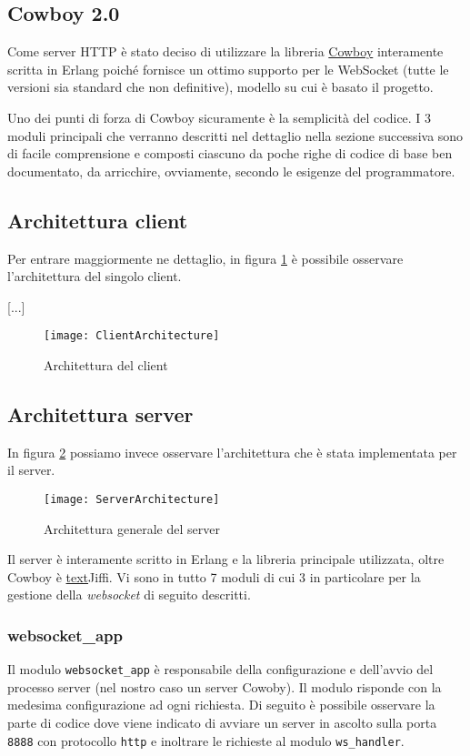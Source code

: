 \documentclass[paper=a4, fontsize=11pt]{scrartcl} %
\numberwithin{equation}{section} %
\numberwithin{figure}{section} %
\numberwithin{table}{section} %
\begin{document}
\subsection{Cowboy 2.0}
Come server HTTP è stato deciso di utilizzare la libreria \href{https://github.com/ninenines/cowboy}{Cowboy} interamente scritta in Erlang poiché fornisce un ottimo supporto per le WebSocket (tutte le versioni sia standard che non definitive), modello su cui è basato il progetto.

Uno dei punti di forza di Cowboy sicuramente è la semplicità del codice. I 3 moduli principali che verranno descritti nel dettaglio nella sezione successiva sono di facile comprensione e composti ciascuno da poche righe di codice di base ben documentato, da arricchire, ovviamente, secondo le esigenze del programmatore.

\subsection{Architettura client}
Per entrare maggiormente ne dettaglio, in figura \ref{ClientArc} è possibile osservare l'architettura del singolo client.

[...]

\begin{figure}[h]
\centering
\texttt{[image: ClientArchitecture]}
\caption{Architettura del client}
\label{ClientArc}
\end{figure}

\subsection{Architettura server}
In figura \ref{ServerArc} possiamo invece osservare l'architettura che è stata implementata per il server.

\begin{figure}[h]
\centering
\texttt{[image: ServerArchitecture]}
\caption{Architettura generale del server}
\label{ServerArc}
\end{figure}

Il server è interamente scritto in Erlang e la libreria principale utilizzata, oltre Cowboy è \href{https://github.com/davisp/jiffy}{text}{Jiffi}. Vi sono in tutto 7 moduli di cui 3 in particolare per la gestione della \textit{websocket} di seguito descritti.
\subsubsection{websocket\_app}
Il modulo \texttt{websocket\_app} è responsabile della configurazione e dell'avvio del processo server (nel nostro caso un server Cowoby). Il modulo risponde con la medesima configurazione ad ogni richiesta.
Di seguito è possibile osservare la parte di codice dove viene indicato di avviare un server in ascolto sulla porta \texttt{8888} con protocollo \texttt{http} e inoltrare le richieste al modulo \texttt{ws\_handler}.
\end{document}
